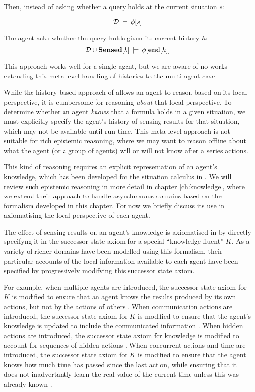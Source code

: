 Then, instead of asking whether a query holds at the current situation
$s$:

\[
\mathcal{D}\,\models\,\phi[s]\]


The agent asks whether the query holds given its current history $h$:\[
\mathcal{D}\cup\mathbf{Sensed}[h]\,\models\,\phi[\mathbf{end}[h]]\]


This approach works well for a single agent, but we are aware of no
works extending this meta-level handling of histories to the multi-agent
case.

While the history-based approach of \citep{giacomo99indigolog} allows
an agent to reason based on its local perspective, it is cumbersome
for reasoning \emph{about} that local perspective. To determine whether
an agent \emph{knows} that a formula holds in a given situation, we
must explicitly specify the agent's history of sensing results for
that situation, which may not be available until run-time. This meta-level
approach is not suitable for rich epistemic reasoning, where we may
want to reason offline about what the agent (or a group of agents)
will or will not know after a series actions.

This kind of reasoning requires an explicit representation of an agent's
knowledge, which has been developed for the situation calculus in
\citep{scherl03sc_knowledge}. We will review such epistemic reasoning
in more detail in chapter \ref{ch:knowledge}, where we extend their
approach to handle asynchronous domains based on the formalism developed
in this chapter. For now we briefly discuss its use in axiomatising
the local perspective of each agent.

The effect of sensing results on an agent's knowledge is axiomatised
in \citep{scherl03sc_knowledge} by directly specifyng it in the successor
state axiom for a special {}``knowledge fluent'' $K$. As a variety
of richer domains have been modelled using this formalism, their particular
accounts of the local information available to each agent have been
specified by progressively modifying this successor state axiom.

For example, when multiple agents are introduced, the successor state
axiom for $K$ is modified to ensure that an agent knows the results
produced by its own actions, but not by the actions of others \citep{shapiro98specifying_ma_systems}.
When communication actions are introduced, the successor state axiom
for $K$ is modified to ensure that the agent's knowledge is updated
to include the communicated information \citep{shapiro98specifying_ma_systems}.
When hidden actions are introduced, the successor state axiom for
knowledge is modified to account for sequences of hidden actions \citep{Lesperance99sitcalc_approach}.
When concurrent actions and time are introduced, the successor state
axiom for $K$ is modified to ensure that the agent knows how much
time has passed since the last action, while ensuring that it does
not inadvertantly learn the real value of the current time unless
this was already known \citep{scherl03conc_knowledge}.

